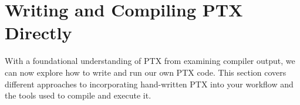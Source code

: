 \section{Writing and Compiling PTX Directly}

With a foundational understanding of PTX from examining compiler output, we can now explore how to write and run our own PTX code. This section covers different approaches to incorporating hand-written PTX into your workflow and the tools used to compile and execute it.

